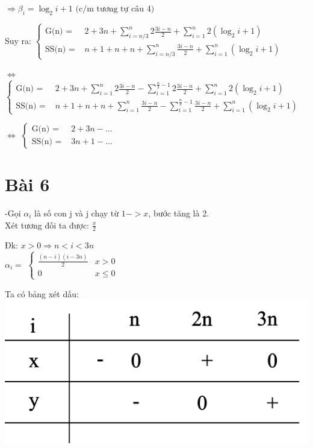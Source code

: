 \documentclass{article}
\newcommand\tab[1][1cm]{\hspace*{#1}}
\begin{document}
\(\Rightarrow  \beta_{i} = \log_{2}{i} + 1 \text{ (c/m tương tự câu 4)}\) 
\vspace{10mm}

\tab Suy ra:
\(
\begin{cases}
    \text{G(n) = } & 2 + 3n +  \sum\limits_{i=n/3}^{n}2\frac{3i-n}{2} + \sum\limits_{i=1}^{n}2(\log_{2}{i} + 1) \\
    \text{SS(n) = } &  n + 1 + n + n +\sum\limits_{i=n/3}^{n}\frac{3i-n}{2} + \sum\limits_{i=1}^{n}(\log_{2}{i} + 1)
\end{cases}
\)

\vspace{5mm}
\tab $\Leftrightarrow $
\(
\begin{cases}
    \text{G(n) = } & 2 + 3n + \sum\limits_{i=1}^{n}2\frac{3i-n}{2} - \sum\limits_{i=1}^{\frac{n}{3}-1}2\frac{3i-n}{2} + \sum\limits_{i=1}^{n}2(\log_{2}{i} + 1) \\
    \text{SS(n) = } &  n + 1 + n + n + \sum\limits_{i=1}^{n}\frac{3i-n}{2} - \sum\limits_{i=1}^{\frac{n}{3}-1}\frac{3i-n}{2} + \sum\limits_{i=1}^{n}(\log_{2}{i} + 1)
\end{cases}
\)

\vspace{5mm}
\tab $\Leftrightarrow $
\(
\begin{cases}
    \text{G(n) = } & 2 + 3n -\dots \\
    \text{SS(n) = } &  3n + 1  - \dots 
\end{cases}
\)

\section*{Bài 6}
-Gọi $\alpha_{i}$ là số con j và j chạy từ $1 -> x $, bước tăng là 2.\\
Xét tương đối ta được: $\frac{x}{2}$
\vspace{5mm}

Đk: \(x > 0 \Rightarrow n < i < 3n\) \\

\vspace{4mm}
\tab $\alpha_{i} = $
\(\begin{cases}
    \frac{(n-i)(i-3n)}{2} & x > 0\\
    0 & x \leq  0
\end{cases}\)

Ta có bảng xét dấu:\\
\tab \includegraphics[scale=0.7]{BT/bangbai6}
\end{document}
